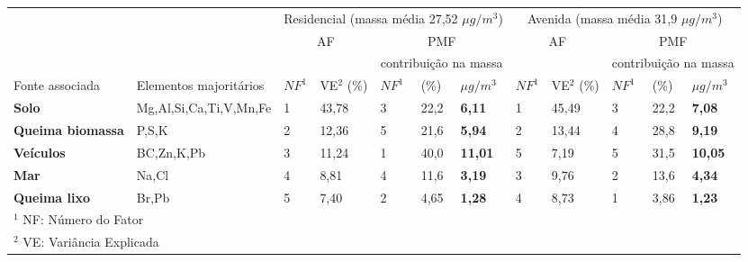 \begin{tabular}{llll|lll|ll|lll}
\hline
                                                  &                        & \multicolumn{5}{c|}{Residencial (massa média 27,52 $\mu g / m^3$)} & \multicolumn{5}{c}{Avenida (massa média 31,9 $\mu g / m^3$)}    \\
                                                  &                        & \multicolumn{2}{c}{AF}      & \multicolumn{3}{c|}{PMF}              & \multicolumn{2}{c}{AF}                      & \multicolumn{3}{c}{PMF}          \\
\hline
 & & & & \multicolumn{3}{c|}{contribuição na massa} & & & \multicolumn{3}{c}{contribuição na massa} \\
Fonte associada                                   & Elementos majoritários & $NF^1$   & VE$^2$ (\%)               & $NF^1$   & (\%)   & $\mu g / m^3$  & $NF^1$       & VE$^2$  (\%)            & $NF^1$ & (\%)  & $\mu g / m^3$ \\
\hline
\textbf{Solo}                                     & Mg,Al,Si,Ca,Ti,V,Mn,Fe & 1   & 43,78                 & 3   & 22,2         & \textbf{6,11}   & 1       & 45,49               & 3 & 22,2        & \textbf{7,08}  \\
\textbf{Queima biomassa}                          & P,S,K                  & 2   & 12,36                 & 5   & 21,6         & \textbf{5,94}   & 2       & 13,44               & 4 & 28,8        & \textbf{9,19}  \\
\textbf{Veículos}                                 & BC,Zn,K,Pb             & 3   & 11,24                 & 1   & 40,0           & \textbf{11,01}  & 5       & 7,19                & 5 & 31,5        & \textbf{10,05} \\
\textbf{Mar}                                      & Na,Cl                  & 4   & 8,81                  & 4   & 11,6         & \textbf{3,19}   & 3       & 9,76                & 2 & 13,6        & \textbf{4,34}  \\
\textbf{Queima lixo} & Br,Pb                      & 5   & 7,40                   & 2   & 4,65         & \textbf{1,28}   & 4       & 8,73                & 1 & 3,86        & \textbf{1,23} \\

\hline
\multicolumn{12}{l}{$^1$ NF: Número do Fator} \\
\multicolumn{12}{l}{$^2$ VE: Variância Explicada} \\
\hline
\end{tabular}

